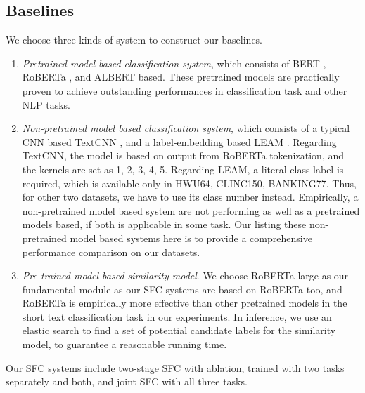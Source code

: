 \documentclass[letterpaper]{article} %
\begin{document}
  \subsection{Baselines}
  We choose three kinds of system to construct our baselines.

  \begin{enumerate}
    \item \emph{Pretrained model based classification system}, which consists of
    BERT \cite{devlin2018bert},  RoBERTa \cite{liu2019roberta},  and  ALBERT  \cite{lan2019albert}  based.  These pretrained
    models  are  practically  proven  to  achieve  outstanding  performances  in
    classification task and other NLP tasks.

    \item   \emph{Non-pretrained   model  based  classification  system},  which
    consists  of  a typical CNN based TextCNN \cite{kim2014convolutional}, and a
    label-embedding based LEAM \cite{wang2018joint}. Regarding TextCNN, the
    model is based on output from RoBERTa tokenization, and the kernels are set
    as 1, 2, 3, 4, 5. Regarding LEAM, a literal class label is required, which
    is available only in HWU64, CLINC150, BANKING77. Thus, for other two
    datasets, we have to use its class number instead.  Empirically,
    a  non-pretrained  model  based  system  are  not  performing  as  well as a
    pretrained  models  based,  if  both is applicable in some task. Our listing
    these  non-pretrained model based systems here is to provide a comprehensive
    performance comparison on our datasets.

    \item   \emph{Pre-trained   model   based   similarity   model}.  We  choose
    RoBERTa-large  as  our  fundamental  module as our SFC systems are based on
    RoBERTa  too, and RoBERTa is empirically more effective than other pretrained
    models  in  the  short  text  classification  task  in  our  experiments. In
    inference,  we  use  an  elastic search to find a set of potential candidate
    labels for the similarity model, to guarantee a reasonable running time.
  \end{enumerate}

  Our SFC systems include two-stage SFC with ablation, trained with two tasks
  separately and both, and joint SFC with all three tasks.
\end{document}
